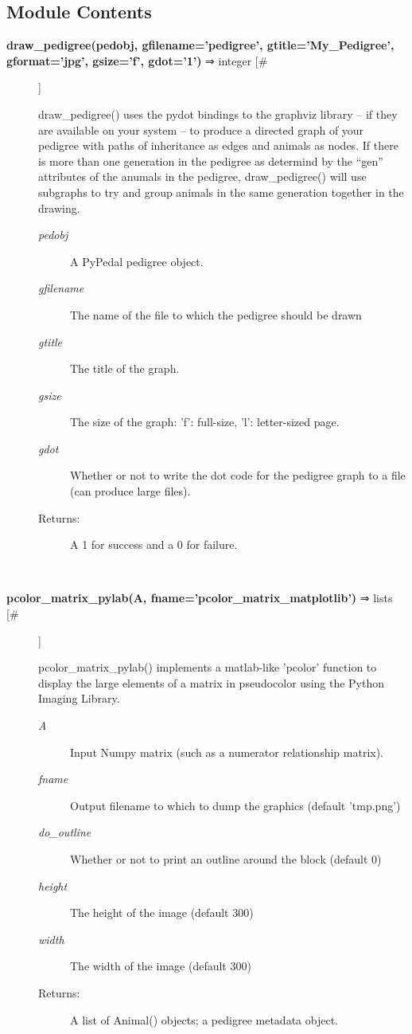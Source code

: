 \documentclass[10pt]{article}
\begin{document}
\subsection*{Module Contents}
\begin{description}
\item[\textbf{draw\_pedigree(pedobj, gfilename='pedigree', gtitle='My\_Pedigree', gformat='jpg', gsize='f', gdot='1')}
 ⇒ integer [\#]]

 draw\_pedigree() uses the pydot bindings to the graphviz library -- if they are available on your system -- to produce a directed graph of your pedigree with paths of inheritance as edges and animals as nodes. If there is more than one generation in the pedigree as determind by the ``gen'' attributes of the anumals in the pedigree, draw\_pedigree() will use subgraphs to try and group animals in the same generation together in the drawing.
\begin{description}
\item[\emph{pedobj}
] A PyPedal pedigree object.
\item[\emph{gfilename}
] The name of the file to which the pedigree should be drawn
\item[\emph{gtitle}
] The title of the graph.
\item[\emph{gsize}
] The size of the graph: 'f': full-size, 'l': letter-sized page.
\item[\emph{gdot}
] Whether or not to write the dot code for the pedigree graph to a file (can produce large files).
\item[Returns:] A 1 for success and a 0 for failure.

\end{description}
\\ 

\item[\textbf{pcolor\_matrix\_pylab(A, fname='pcolor\_matrix\_matplotlib')}
 ⇒ lists [\#]]

 pcolor\_matrix\_pylab() implements a matlab-like 'pcolor' function to display the large elements of a matrix in pseudocolor using the Python Imaging Library.
\begin{description}
\item[\emph{A}
] Input Numpy matrix (such as a numerator relationship matrix).
\item[\emph{fname}
] Output filename to which to dump the graphics (default 'tmp.png')
\item[\emph{do\_outline}
] Whether or not to print an outline around the block (default 0)
\item[\emph{height}
] The height of the image (default 300)
\item[\emph{width}
] The width of the image (default 300)
\item[Returns:] A list of Animal() objects; a pedigree metadata object.


\end{description}
\end{description}
\end{document}
